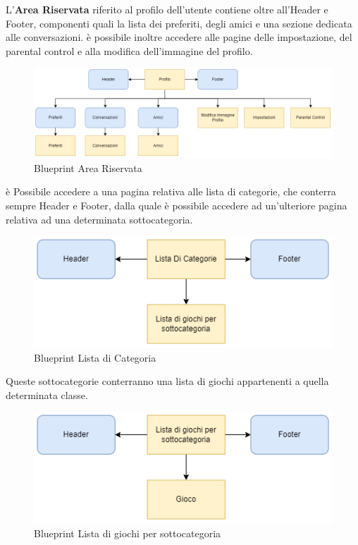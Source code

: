 \documentclass[../Report.tex]{subfiles}
\begin{document}
    L'\textbf{Area Riservata} riferito al profilo dell'utente contiene oltre all'Header e Footer, componenti quali la lista dei preferiti, degli amici e una sezione dedicata alle conversazioni. 
    è possibile inoltre accedere alle pagine delle impostazione, del parental control e alla modifica dell'immagine del profilo. 
    \begin{figure}[H]
        \includegraphics[width=\linewidth]{BP_profilo.png}
        \centering
        \caption{Blueprint Area Riservata}
    \end{figure}


    è Possibile accedere a una pagina relativa alle lista di categorie, che conterra sempre Header e Footer, dalla quale è possibile accedere ad un'ulteriore pagina relativa ad una determinata sottocategoria.
    \begin{figure}[H]
        \includegraphics[width=.7\linewidth]{BP_listaCategoria.png}
        \centering
        \caption{Blueprint Lista di Categoria}
    \end{figure}
    Queste sottocategorie conterranno una lista di giochi appartenenti a quella determinata classe.
    \begin{figure}[H]
        \includegraphics[width=.7\linewidth]{BP_ListaGiochiPerSottocategoria.png}
        \centering
        \caption{Blueprint Lista di giochi per sottocategoria}
    \end{figure}
\end{document}
